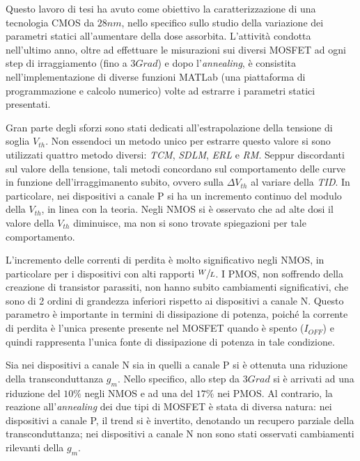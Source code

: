Questo lavoro di tesi ha avuto come obiettivo la caratterizzazione di una tecnologia CMOS da $28nm$, nello specifico sullo studio della variazione dei parametri statici all'aumentare della dose assorbita.
L'attività condotta nell'ultimo anno, oltre ad effettuare le misurazioni sui diversi MOSFET ad ogni step di irraggiamento (fino a $3Grad$) e dopo l'\textit{annealing}, è consistita nell'implementazione di diverse funzioni MATLab (una piattaforma di programmazione e calcolo numerico) volte ad estrarre i parametri statici presentati.

\vspace{0.5cm}

Gran parte degli sforzi sono stati dedicati all'estrapolazione della tensione di soglia $V_{th}$. Non essendoci un metodo unico per estrarre questo valore si sono utilizzati quattro metodo diversi: \textit{TCM}, \textit{SDLM}, \textit{ERL} e \textit{RM}. Seppur discordanti sul valore della tensione, tali metodi concordano sul comportamento delle curve in funzione dell'irraggimanento subito, ovvero sulla $\Delta V_{th}$ al variare della \textit{TID}. In particolare, nei dispositivi a canale P si ha un incremento continuo del modulo della $V_{th}$, in linea con la teoria. Negli NMOS si è osservato che ad alte dosi il valore della $V_{th}$ diminuisce, ma non si sono trovate spiegazioni per tale comportamento.

L'incremento delle correnti di perdita è molto significativo negli NMOS, in particolare per i dispositivi con alti rapporti $\sfrac{W}{L}$. I PMOS, non soffrendo della creazione di transistor parassiti, non hanno subito cambiamenti significativi, che sono di 2 ordini di grandezza inferiori rispetto ai dispositivi a canale N. Questo parametro è importante in termini di dissipazione di potenza, poiché la corrente di perdita è l'unica presente presente nel MOSFET quando è spento ($I_{OFF}$) e quindi rappresenta l'unica fonte di dissipazione di potenza in tale condizione.   

Sia nei dispositivi a canale N sia in quelli a canale P si è ottenuta una riduzione della transconduttanza $g_m$. Nello specifico, allo step da $3Grad$ si è arrivati ad una riduzione del $10\%$ negli NMOS e ad una del $17\%$ nei PMOS. Al contrario, la reazione all'\textit{annealing} dei due tipi di MOSFET è stata di diversa natura: nei dispositivi a canale P, il trend si è invertito, denotando un recupero parziale della transconduttanza; nei dispositivi a canale N non sono stati osservati cambiamenti rilevanti della $g_m$.    

   